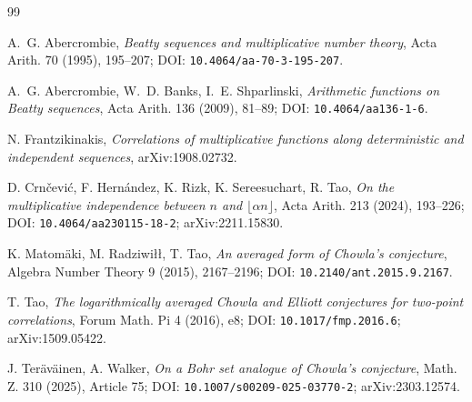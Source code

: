 \documentclass[preprint,12pt]{elsarticle}
\numberwithin{equation}{section}
\theoremstyle{plain}
\theoremstyle{definition}
\theoremstyle{remark}
\begin{document}
\begin{thebibliography}{99}
\raggedright

A.~G. Abercrombie,
\textit{Beatty sequences and multiplicative number theory},
Acta Arith. 70 (1995), 195--207; DOI: \nolinkurl{10.4064/aa-70-3-195-207}.

A.~G. Abercrombie, W.~D. Banks, I.~E. Shparlinski,
\textit{Arithmetic functions on Beatty sequences},
Acta Arith. 136 (2009), 81--89; DOI: \nolinkurl{10.4064/aa136-1-6}.

N. Frantzikinakis,
\textit{Correlations of multiplicative functions along deterministic and
independent sequences},
arXiv:1908.02732.

D. Crn\v{c}evi\'c, F. Hern\'andez, K. Rizk, K. Sereesuchart, R. Tao,
\textit{On the multiplicative independence between $n$ and
$\lfloor \alpha n\rfloor$},
Acta Arith. 213 (2024), 193--226;
DOI: \nolinkurl{10.4064/aa230115-18-2};
arXiv:2211.15830.

K. Matom\"aki, M. Radziwi{\l}{\l}, T. Tao,
\textit{An averaged form of Chowla's conjecture},
Algebra Number Theory 9 (2015), 2167--2196; DOI: \nolinkurl{10.2140/ant.2015.9.2167}.

T. Tao,
\textit{The logarithmically averaged Chowla and Elliott conjectures for
two-point correlations},
Forum Math. Pi 4 (2016), e8; DOI: \nolinkurl{10.1017/fmp.2016.6};
arXiv:1509.05422.

J. Ter\"av\"ainen, A. Walker,
\textit{On a Bohr set analogue of Chowla's conjecture},
Math. Z. 310 (2025), Article 75; DOI: \nolinkurl{10.1007/s00209-025-03770-2};
arXiv:2303.12574.

\end{thebibliography}
\end{document}
